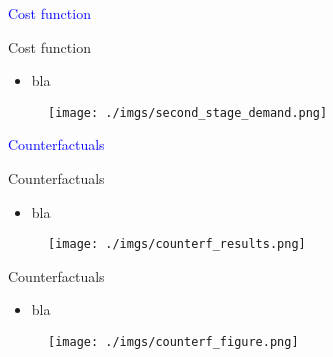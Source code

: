 \documentclass[notes,11pt, aspectratio=169]{beamer}
\begin{document}
\begin{frame}
    \textcolor{blue}{\huge{\centerline{Cost function}}}
\end{frame}

\begin{frame}{Cost function}\label{cost}
    \vspace{0.5cm}
      \begin{itemize}
        \item  bla
      \end{itemize}
      
        \begin{figure}[t*]
          \centering
    
          \texttt{[image: ./imgs/second\_stage\_demand.png]}
        \end{figure}

        \hyperlink{costiv}{}
        
      \end{frame}

\begin{frame}
    \textcolor{blue}{\huge{\centerline{Counterfactuals}}}
\end{frame}

\begin{frame}{Counterfactuals}
    \vspace{0.5cm}
      \begin{itemize}
        \item  bla
      \end{itemize}
      
        \begin{figure}[t*]
          \centering
    
          \texttt{[image: ./imgs/counterf\_results.png]}
        \end{figure}
        
      \end{frame}

\begin{frame}{Counterfactuals}
    \vspace{0.5cm}
      \begin{itemize}
        \item  bla
      \end{itemize}
      
        \begin{figure}[t*]
          \centering
    
          \texttt{[image: ./imgs/counterf\_figure.png]}
        \end{figure}
        
      \end{frame}
\end{document}
